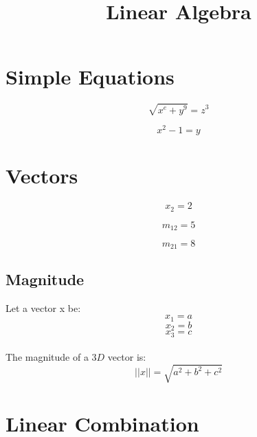 \documentclass{article}
\begin{document}
\title{Linear Algebra}

\section{Simple Equations}

$$\sqrt{x^e + y^9} = z^3$$

$$x^2-1 =y$$

\section{Vectors}

$$x_2=2$$

$$m_{12}=5$$

$$m_{21}=8$$

\subsection{Magnitude}
Let a vector x be:
$$x_1=a$$
$$x_2=b$$
$$x_3=c$$\\
The magnitude of a $3D$ vector is:
$$||x|| = \sqrt{a^2+b^2+c^2}$$

\section{Linear Combination}
\end{document}
